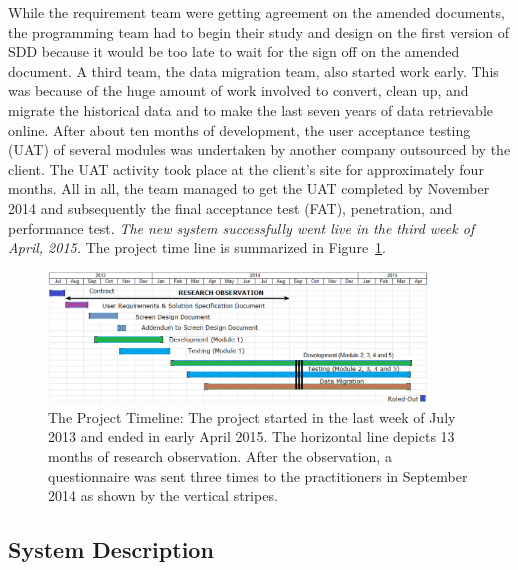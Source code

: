 \documentclass[conference]{IEEEtran}
\begin{document}
While the requirement team were getting agreement on the amended
documents, the programming team had to begin their study and design on
the first version of SDD because it would be too late to wait for the
sign off on the amended document. A third team, the data migration
team, also started work early. This was because of the huge amount of
work involved to convert, clean up, and migrate the historical data
and to make the last seven years of data retrievable online. After
about ten months of development, the user acceptance testing (UAT) of
several modules was undertaken by another company outsourced by the
client. The UAT activity took place at the client's site for
approximately four months. All in all, the team managed to get the UAT
completed by November 2014 and subsequently the final acceptance test
(FAT), penetration, and performance test. \textit{The new system
  successfully went live in the third week of April, 2015.} The
project time line is summarized in Figure~\ref{fig:timeline}.

\begin{figure}
\centering
\includegraphics[width=0.9\textwidth]{pics/project422.png}
\caption{The Project Timeline: The project started in the last week of
  July 2013 and ended in early April 2015. The horizontal line depicts
  13 months of research observation. After the observation, a
  questionnaire was sent three times to the practitioners in September
  2014 as shown by the vertical stripes.}
\label{fig:timeline}
\end{figure}

\subsection{System Description}
\end{document}
